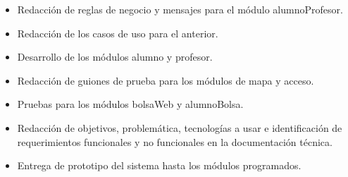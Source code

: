 \begin{itemize}
	\item Redacción de reglas de negocio y mensajes para el módulo alumnoProfesor.
	\item Redacción de los casos de uso para el anterior.
	\item Desarrollo de los módulos alumno y profesor.
	\item Redacción de guiones de prueba para los módulos de mapa y acceso.
	\item Pruebas para los módulos bolsaWeb y alumnoBolsa.
	\item Redacción de objetivos, problemática, tecnologías a usar e identificación de requerimientos funcionales y no funcionales en la documentación técnica.
	\item Entrega de prototipo del sistema hasta los módulos programados.
\end{itemize}

